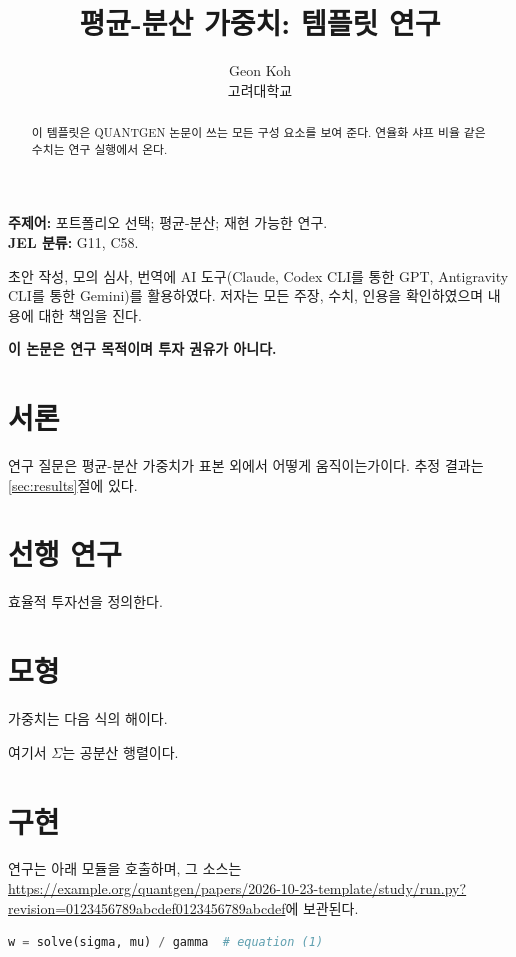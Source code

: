 \documentclass[11pt,a4paper]{article}
\title{평균-분산 가중치: 템플릿 연구}
\author{Geon Koh\\고려대학교}
\date{}
\begin{document}
\maketitle
{}

\begin{abstract}
이 템플릿은 QUANTGEN 논문이 쓰는 모든 구성 요소를 보여 준다. 연율화 샤프 비율 \과 같은 수치는 연구 실행에서 온다.
\end{abstract}

\noindent\textbf{주제어:} 포트폴리오 선택; 평균-분산; 재현 가능한 연구.\\
\noindent\textbf{JEL 분류:} G11, C58.

\begin{aistatement}
초안 작성, 모의 심사, 번역에 AI 도구(Claude, Codex CLI를 통한 GPT, Antigravity CLI를 통한 Gemini)를 활용하였다. 저자는 모든 주장, 수치, 인용을 확인하였으며 내용에 대한 책임을 진다.
\end{aistatement}

\noindent\textbf{이 논문은 연구 목적이며 투자 권유가 아니다.}

\section{서론}\label{sec:intro}
연구 질문은 평균-분산 가중치가 표본 외에서 어떻게 움직이는가이다. 추정 결과는 \ref{sec:results}절에 있다.

\section{선행 연구}\label{sec:literature}
\citet{markowitz1952}\는 효율적 투자선을 정의한다.

\section{모형}\label{sec:model}
가중치는 다음 식의 해이다.

여기서 \(\Sigma\)는 공분산 행렬이다.

\section{구현}\label{sec:implementation}
연구는 아래 모듈을 호출하며, 그 소스는 \url{https://example.org/quantgen/papers/2026-10-23-template/study/run.py?revision=0123456789abcdef0123456789abcdef}에 보관된다.
\begin{lstlisting}[language=Python]
w = solve(sigma, mu) / gamma  # equation (1)
\end{lstlisting}
\end{document}
